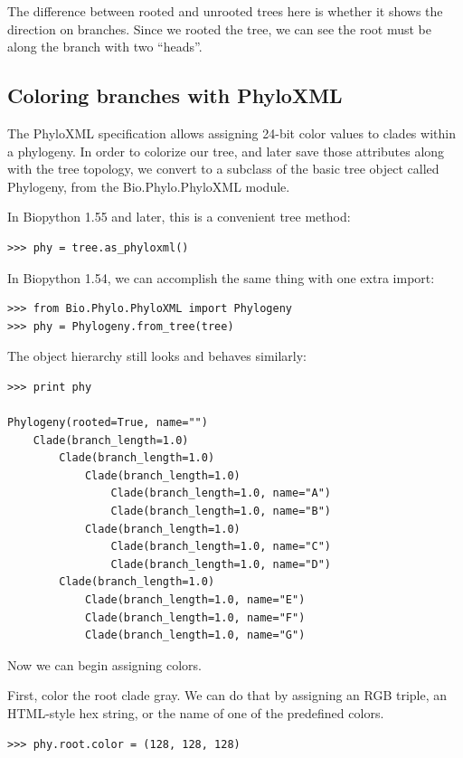 \documentclass{report}
\begin{document}
The difference between rooted and unrooted trees here is whether it shows the direction on
branches. Since we rooted the tree, we can see the root must be along the branch with two
``heads''.


\subsection{Coloring branches with PhyloXML}

The PhyloXML specification allows assigning 24-bit color values to clades within a phylogeny.
In order to colorize our tree, and later save those attributes along with the tree topology, we
convert to a subclass of the basic tree object called Phylogeny, from the Bio.Phylo.PhyloXML
module.

In Biopython 1.55 and later, this is a convenient tree method:

\begin{verbatim}
>>> phy = tree.as_phyloxml()
\end{verbatim}

In Biopython 1.54, we can accomplish the same thing with one extra import:

\begin{verbatim}
>>> from Bio.Phylo.PhyloXML import Phylogeny
>>> phy = Phylogeny.from_tree(tree)
\end{verbatim}

The object hierarchy still looks and behaves similarly:

\begin{verbatim}
>>> print phy

Phylogeny(rooted=True, name="")
    Clade(branch_length=1.0)
        Clade(branch_length=1.0)
            Clade(branch_length=1.0)
                Clade(branch_length=1.0, name="A")
                Clade(branch_length=1.0, name="B")
            Clade(branch_length=1.0)
                Clade(branch_length=1.0, name="C")
                Clade(branch_length=1.0, name="D")
        Clade(branch_length=1.0)
            Clade(branch_length=1.0, name="E")
            Clade(branch_length=1.0, name="F")
            Clade(branch_length=1.0, name="G")
\end{verbatim}

Now we can begin assigning colors.

First, color the root clade gray.  We can do that by assigning an RGB triple, an HTML-style
hex string, or the name of one of the predefined colors.

\begin{verbatim}
>>> phy.root.color = (128, 128, 128)
\end{verbatim}
\end{document}

